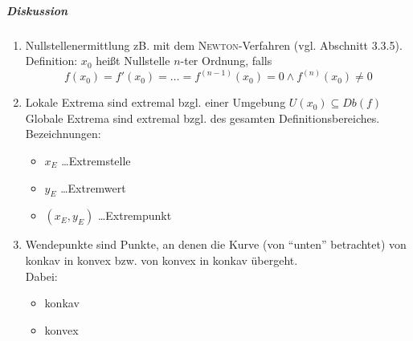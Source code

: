 \documentclass[a4paper]{scrartcl}
\begin{document}
\subparagraph{Diskussion}
\begin{enumerate}
\item Nullstellenermittlung zB. mit dem \textsc{Newton}-Verfahren (vgl. Abschnitt 3.3.5).\\
Definition: $x_0$ heißt Nullstelle $n$-ter Ordnung, falls
\[ f(x_0) = f'(x_0) = \dots = f^{(n-1)} (x_0) = 0 \wedge f^{(n)} (x_0) \neq 0 \]
\item Lokale Extrema sind extremal bzgl. einer Umgebung $U(x_0) \subseteq Db(f)$\\
Globale Extrema sind extremal bzgl. des gesamten Definitionsbereiches.\\
Bezeichnungen: 
\begin{itemize}
\item $x_E$ \dots Extremstelle 
\item $y_E$ \dots Extremwert 
\item $(x_E, y_E)$ \dots Extrempunkt
\end{itemize}
\item Wendepunkte sind Punkte, an denen die Kurve (von "`unten"' betrachtet) von konkav in konvex bzw. von konvex in konkav übergeht.\\
Dabei:
\begin{itemize}
\item konkav %
\item konvex 


\end{itemize}
\end{enumerate}
\end{document}

